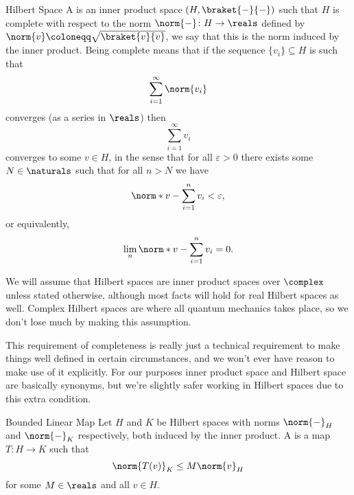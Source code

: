 \documentclass[fleqn]{NotesClass}
\begin{document}
    \begin{dfn}{Hilbert Space}{}
        A  is an inner product space \((H, \braket{-}{-})\) such that \(H\) is complete with respect to the norm \(\norm{-} \colon H \to \reals\) defined by \(\norm{v} \coloneqq \sqrt{\braket{v}{v}}\), we say that this is the norm induced by the inner product.
        Being complete means that if the sequence \(\{v_i\} \subseteq H\) is such that
        \begin{equation}
            \sum_{i = 1}^{\infty} \norm{v_i}
        \end{equation}
        converges (as a series in \(\reals\)) then
        \begin{equation}
            \sum_{i = 1}^{\infty} v_i
        \end{equation}
        converges to some \(v \in H\), in the sense that for all \(\varepsilon > 0\) there exists some \(N \in \naturals\) such that for all \(n > N\) we have
        \begin{equation}
            \norm*{v - \sum_{i = 1}^{n} v_i} < \varepsilon,
        \end{equation}
        or equivalently,
        \begin{equation}
            \lim_n \norm*{v - \sum_{i = 1}^{n} v_i} = 0.
        \end{equation}
    \end{dfn}
    
    We will assume that Hilbert spaces are inner product spaces over \(\complex\) unless stated otherwise, although most facts will hold for real Hilbert spaces as well.
    Complex Hilbert spaces are where all quantum mechanics takes place, so we don't lose much by making this assumption.
    
    This requirement of completeness is really just a technical requirement to make things well defined in certain circumstances, and we won't ever have reason to make use of it explicitly.
    For our purposes inner product space and Hilbert space are basically synonyms, but we're slightly safer working in Hilbert spaces due to this extra condition.
    
    \begin{dfn}{Bounded Linear Map}{}
        Let \(H\) and \(K\) be Hilbert spaces with norms \(\norm{-}_H\) and \(\norm{-}_K\) respectively, both induced by the inner product.
        A  is a map \(T \colon H \to K\) such that
        \begin{equation}
            \norm{T(v)}_K \le M \norm{v}_H
        \end{equation}
        for some \(M \in \reals\) and all \(v \in H\).
    \end{dfn}
    
\end{document}
